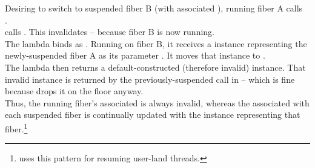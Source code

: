Desiring to switch to suspended fiber B (with associated
 ), running fiber A calls\\
.\\

 calls .
This invalidates  -- because fiber B is now running.\\

The lambda binds  as . Running on fiber B, it
receives a \fiber instance representing the newly-suspended fiber A as its
parameter . It moves that \fiber instance to .\\

The lambda then returns a default-constructed (therefore invalid) \fiber
instance. That invalid instance is returned by the previously-suspended
\resumewith call in  -- which is fine because
 drops it on the floor anyway.\\

Thus, the running fiber's associated  is always invalid,
whereas the  associated with each suspended fiber is continually
updated with the \fiber instance representing that
fiber.\footnote{\bfiber\cite{bfiber} uses this pattern for resuming user-land
threads.}

